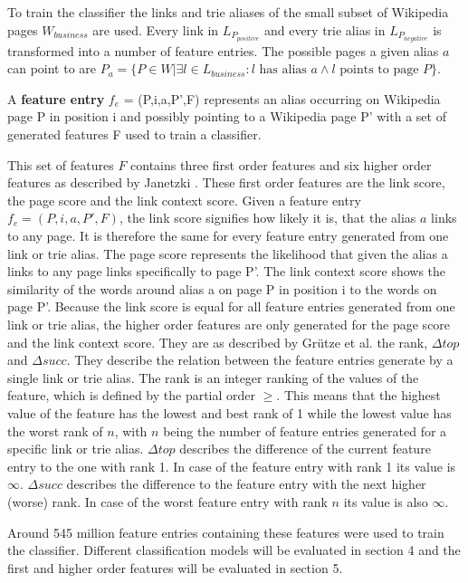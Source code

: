 To train the classifier the links and trie aliases of the small subset of Wikipedia pages $W_{business}$ are used. Every link in $L_{P_{positive}}$ and every trie alias in $L_{P_{negative}}$ is transformed into a number of feature entries. The possible pages a given alias $a$ can point to are $P_a = \{ P \in W | \exists l \in L_{business}: l \text{ has alias } a \land l \text{ points to page } P \}$.
\begin{definition}
A \textbf{feature entry} $f_e$ = (P,i,a,P',F) represents an alias occurring on Wikipedia page P in position i and possibly pointing to a Wikipedia page P' with a set of generated features F used to train a classifier.
\label{featureentry}
\end{definition}
This set of features $F$ contains three first order features and six higher order features as described by Janetzki \cite{janetzki}. These first order features are the link score, the page score and the link context score. Given a feature entry $f_e = (P,i,a,P',F)$, the link score signifies how likely it is, that the alias $a$ links to any page. It is therefore the same for every feature entry generated from one link or trie alias. The page score represents the likelihood that given the alias a links to any page links specifically to page P'. The link context score shows the similarity of the words around alias a on page P in position i to the words on page P'. Because the link score is equal for all feature entries generated from one link or trie alias, the higher order features are only generated for the page score and the link context score. They are as described by Grütze et al. \cite{coheel} the rank, $\Delta top$ and $\Delta succ$. They describe the relation between the feature entries generate by a single link or trie alias. The rank is an integer ranking of the values of the feature, which is defined by the partial order $\geq$. This means that the highest value of the feature has the lowest and best rank of 1 while the lowest value has the worst rank of $n$, with $n$ being the number of feature entries generated for a specific link or trie alias. $\Delta top$ describes the difference of the current feature entry to the one with rank 1. In case of the feature entry with rank 1 its value is $\infty$. $\Delta succ$ describes the difference to the feature entry with the next higher (worse) rank. In case of the worst feature entry with rank $n$ its value is also $\infty$.\par
Around 545 million feature entries containing these features were used to train the classifier. Different classification models will be evaluated in section 4 and the first and higher order features will be evaluated in section 5.

